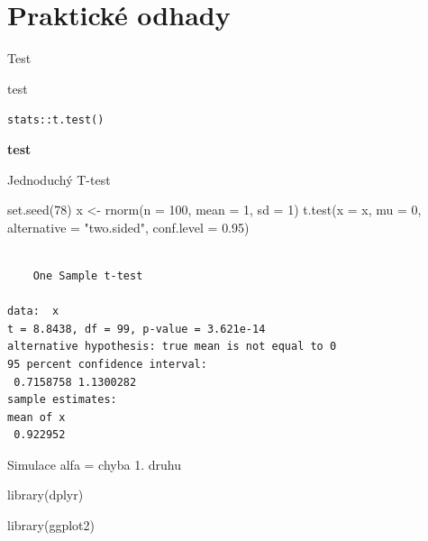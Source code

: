 \documentclass[
  11pt,
  a4paper]{report}
\newenvironment{Shaded}{\begin{snugshade}}{\end{snugshade}}
\newcommand{\AttributeTok}[1]{\textcolor[rgb]{0.40,0.45,0.13}{#1}}
\newcommand{\DecValTok}[1]{\textcolor[rgb]{0.68,0.00,0.00}{#1}}
\newcommand{\FloatTok}[1]{\textcolor[rgb]{0.68,0.00,0.00}{#1}}
\newcommand{\FunctionTok}[1]{\textcolor[rgb]{0.28,0.35,0.67}{#1}}
\newcommand{\NormalTok}[1]{\textcolor[rgb]{0.00,0.23,0.31}{#1}}
\newcommand{\OtherTok}[1]{\textcolor[rgb]{0.00,0.23,0.31}{#1}}
\newcommand{\StringTok}[1]{\textcolor[rgb]{0.13,0.47,0.30}{#1}}
\begin{document}
\chapter{Praktické odhady}\label{praktickuxe9-odhady}

Test

test

\texttt{stats::t.test()}

\textbf{test}

Jednoduchý T-test

\begin{Shaded}
\begin{Highlighting}[]
\FunctionTok{set.seed}\NormalTok{(}\DecValTok{78}\NormalTok{)}
\NormalTok{x }\OtherTok{\textless{}{-}} \FunctionTok{rnorm}\NormalTok{(}\AttributeTok{n =} \DecValTok{100}\NormalTok{, }\AttributeTok{mean =} \DecValTok{1}\NormalTok{, }\AttributeTok{sd =} \DecValTok{1}\NormalTok{)}
\FunctionTok{t.test}\NormalTok{(}\AttributeTok{x =}\NormalTok{ x, }\AttributeTok{mu =} \DecValTok{0}\NormalTok{,}
       \AttributeTok{alternative =} \StringTok{"two.sided"}\NormalTok{, }\AttributeTok{conf.level =} \FloatTok{0.95}\NormalTok{)}
\end{Highlighting}
\end{Shaded}

\begin{verbatim}

    One Sample t-test

data:  x
t = 8.8438, df = 99, p-value = 3.621e-14
alternative hypothesis: true mean is not equal to 0
95 percent confidence interval:
 0.7158758 1.1300282
sample estimates:
mean of x 
 0.922952 
\end{verbatim}

Simulace alfa = chyba 1. druhu

\begin{Shaded}
\begin{Highlighting}[]
\FunctionTok{library}\NormalTok{(dplyr)}
\end{Highlighting}
\end{Shaded}

\begin{Shaded}
\begin{Highlighting}[]
\FunctionTok{library}\NormalTok{(ggplot2)}
\end{Highlighting}
\end{Shaded}
\end{document}
